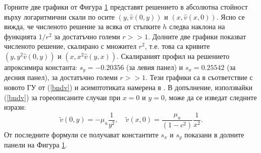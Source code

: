 \documentclass[a4paper]{article}
\newcommand{\be}{\begin{equation}}
\newcommand{\ee}{\end{equation}}
\newcommand{\rf}[1]{(\ref{#1})}
\theoremstyle{remark}
\begin{document}
\begin{large}
\begin{figure}[ht]
	\label{fig:bndCross}
\end{figure}
\FloatBarrier
Горните две графики от Фигура \ref{fig:bndCross} представят решението в абсолютна стойност върху логаритмични скали по осите $(y,\widehat v(0,y) )$ и $(x,\widehat v(x,0))$. Ясно се вижда, че численото решение за всяка от стъпките $h$ следва наклона на функцията $1/r^2$ за достатъчно големи $r >> 1$. Долните две графики показват численото решение, скалирано с множител $r^2$, т.е. това са кривите $(y, y^2 \widehat v(0, y) )$ и $(x, x^2 \widehat v(y, x) )$. Скалираният профил на решението апроксимира константа: $s_y=-0.20356$ (за левия панел) и $s_x=0.25542$ (за десния панел), за достатъчно големи $r >> 1$. Тези графики са в съответствие с новото ГУ от \rf{bndv} и асимптотиката намерена в \cite{ref116}. В допълнение, използвайки \rf{bndv} за гореописаните случаи при $x=0$ и $y=0$, може да се изведат следните изрази:
\be
\tilde v(0, y) = -\mu_u \frac{1}{y^2}, \quad \tilde v(x, 0) = \frac{\mu_u}{(1-c^2)} \frac{1}{x^2}.
\ee
От последните формули се получават константите $s_x$ и $s_y$ показани в долните панели на Фигура \ref{fig:bndCross}.


\end{large}
\end{document}
